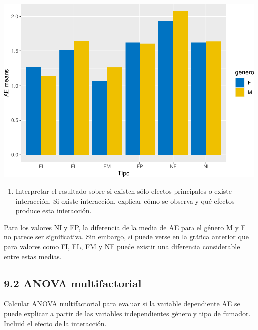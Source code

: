 \documentclass[
]{article}
\providecommand{\tightlist}{%
  \setlength{\itemsep}{0pt}\setlength{\parskip}{0pt}}
\begin{document}
\includegraphics{A4_files/figure-latex/unnamed-chunk-45-1.pdf}

\vspace{0.3cm}

\begin{enumerate}
\def\labelenumi{\arabic{enumi}.}
\setcounter{enumi}{2}
\tightlist
\item
  Interpretar el resultado sobre si existen sólo efectos principales o
  existe interacción. Si existe interacción, explicar cómo se observa y
  qué efectos produce esta interacción.
\end{enumerate}

\vspace{0.3cm}

Para los valores NI y FP, la diferencia de la media de AE para el género
M y F no parece ser significativa. Sin embargo, sí puede verse en la
gráfica anterior que para valores como FI, FL, FM y NF puede existir una
diferencia considerable entre estas medias.

\vspace{0.3cm}

\hypertarget{anova-multifactorial-1}{%
\subsection{9.2 ANOVA multifactorial}\label{anova-multifactorial-1}}

Calcular ANOVA multifactorial para evaluar si la variable dependiente AE
se puede explicar a partir de las variables independientes género y tipo
de fumador. Incluid el efecto de la interacción.

\vspace{0.3cm}
\end{document}
